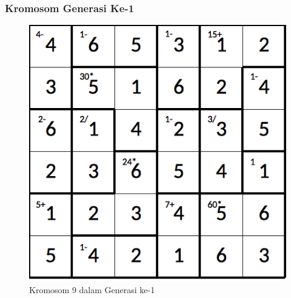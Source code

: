 \documentclass{beamer}
\begin{document}
\note{

}

\begin{frame}
\frametitle{Kromosom Generasi Ke-1}
\begin{figure}
\centering
\captionsetup{justification=centering}
\includegraphics[scale=0.333]{Gambar/hybridgenetic/Generation1Chromosome9}
\caption[Kromosom 9 dalam Generasi ke-1]{Kromosom 9 dalam Generasi ke-1}
\label{fig:analisisg1k9}
\end{figure}
\end{frame}

\note{

}
\end{document}

